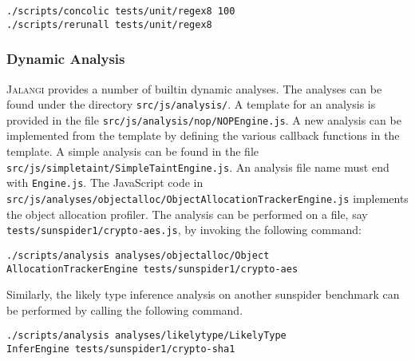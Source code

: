\documentclass{sig-alternate}
\def\jalangi{\textsc{Jalangi}}
\begin{document}
\begin{verbatim}
./scripts/concolic tests/unit/regex8 100
./scripts/rerunall tests/unit/regex8
\end{verbatim}

\subsubsection*{Dynamic Analysis}
\label{sec:dynamic-analysis}

\jalangi{} provides a number of builtin dynamic analyses.  The
analyses can be found under the directory \texttt{src/js/analysis/}.
A template for an analysis is provided in the file
\texttt{src/js/analysis/nop/NOPEngine.js}.  A new analysis can be
implemented from the template by defining the various callback
functions in the template.  A simple analysis can be found in the file
\texttt{src/js/simpletaint/SimpleTaintEngine.js}.  An analysis file
name must end with \texttt{Engine.js}.  The JavaScript code in
\texttt{src/js/analyses/objectalloc/ObjectAllocationTrackerEngine.js}
implements the object allocation profiler. The analysis can be
performed on a file, say \texttt{tests/sunspider1/crypto-aes.js}, by
invoking the following command:

\begin{verbatim}
./scripts/analysis analyses/objectalloc/Object
AllocationTrackerEngine tests/sunspider1/crypto-aes
\end{verbatim}

Similarly, the likely type inference analysis on another sunspider
benchmark can be performed by calling the following command.

\begin{verbatim}
./scripts/analysis analyses/likelytype/LikelyType
InferEngine tests/sunspider1/crypto-sha1
\end{verbatim}



\end{document}
